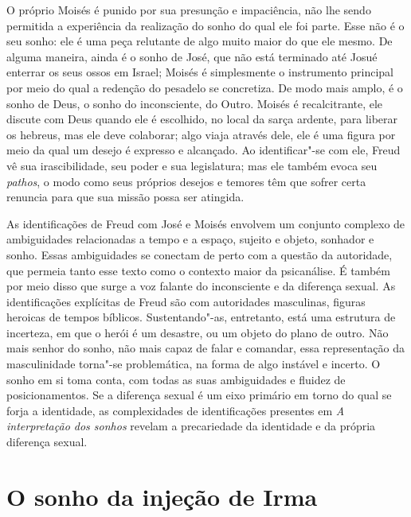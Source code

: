 O próprio Moisés é punido por sua presunção e impaciência, não lhe sendo
permitida a experiência da realização do sonho do qual ele foi parte.
Esse não é o seu sonho: ele é uma peça relutante de algo muito maior do
que ele mesmo. De alguma maneira, ainda é o sonho de José, que não está
terminado até Josué enterrar os seus ossos em Israel; Moisés é
simplesmente o instrumento principal por meio do qual a redenção do
pesadelo se concretiza. De modo mais amplo, é o sonho de Deus, o sonho
do inconsciente, do Outro. Moisés é recalcitrante, ele discute com Deus
quando ele é escolhido, no local da sarça ardente, para liberar os
hebreus, mas ele deve colaborar; algo viaja através dele, ele é uma
figura por meio da qual um desejo é expresso e alcançado. Ao
identificar"-se com ele, Freud vê sua irascibilidade, seu poder e sua
legislatura; mas ele também evoca seu \emph{pathos}, o modo como seus
próprios desejos e temores têm que sofrer certa renuncia para que sua
missão possa ser atingida.

As identificações de Freud com José e Moisés envolvem um conjunto
complexo de ambiguidades relacionadas a tempo e a espaço, sujeito e
objeto, sonhador e sonho. Essas ambiguidades se conectam de perto com a
questão da autoridade, que permeia tanto esse texto como o contexto
maior da psicanálise. É também por meio disso que surge a voz falante do
inconsciente e da diferença sexual. As identificações explícitas de
Freud são com autoridades masculinas, figuras heroicas de tempos
bíblicos. Sustentando"-as, entretanto, está uma estrutura de incerteza,
em que o herói é um desastre, ou um objeto do plano de outro. Não mais
senhor do sonho, não mais capaz de falar e comandar, essa representação
da masculinidade torna"-se problemática, na forma de algo instável e
incerto. O sonho em si toma conta, com todas as suas ambiguidades e
fluidez de posicionamentos. Se a diferença sexual é um eixo primário em
torno do qual se forja a identidade, as complexidades de identificações
presentes em \emph{A interpretação dos sonhos} revelam a precariedade da
identidade e da própria diferença sexual.

\section{O sonho da injeção de Irma}


